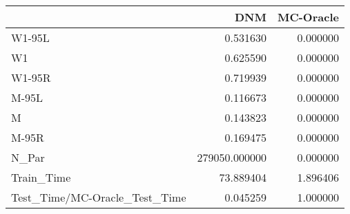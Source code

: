 \begin{tabular}{lrr}
\toprule
{} &            DNM &  MC-Oracle \\
\midrule
W1-95L                        &       0.531630 &   0.000000 \\
W1                            &       0.625590 &   0.000000 \\
W1-95R                        &       0.719939 &   0.000000 \\
M-95L                         &       0.116673 &   0.000000 \\
M                             &       0.143823 &   0.000000 \\
M-95R                         &       0.169475 &   0.000000 \\
N\_Par                         &  279050.000000 &   0.000000 \\
Train\_Time                    &      73.889404 &   1.896406 \\
Test\_Time/MC-Oracle\_Test\_Time &       0.045259 &   1.000000 \\
\bottomrule
\end{tabular}
